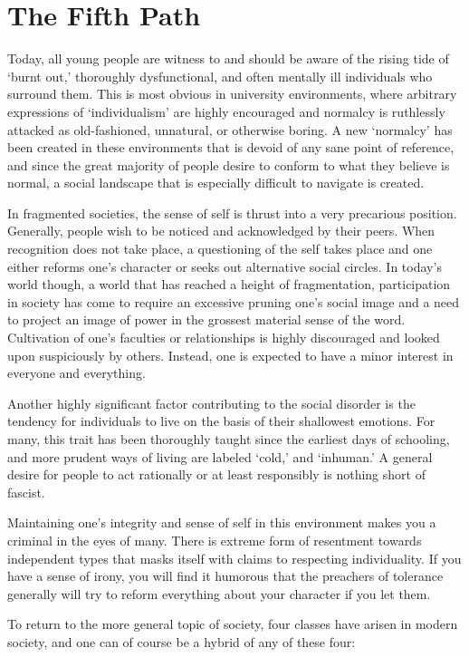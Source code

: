 \section{The Fifth Path}

Today, all young people are witness to and should be aware of the rising tide of `burnt out,' thoroughly dysfunctional, and often mentally ill individuals who surround them. This is most obvious in university environments, where arbitrary expressions of `individualism' are highly encouraged and normalcy is ruthlessly attacked as old-fashioned, unnatural, or otherwise boring. A new `normalcy' has been created in these environments that is devoid of any sane point of reference, and since the great majority of people desire to conform to what they believe is normal, a social landscape that is especially difficult to navigate is created.

In fragmented societies, the sense of self is thrust into a very precarious position. Generally, people wish to be noticed and acknowledged by their peers. When recognition does not take place, a questioning of the self takes place and one either reforms one's character or seeks out alternative social circles. In today's world though, a world that has reached a height of fragmentation, participation in society has come to require an excessive pruning one's social image and a need to project an image of power in the grossest material sense of the word. Cultivation of one's faculties or relationships is highly discouraged and looked upon suspiciously by others. Instead, one is expected to have a minor interest in everyone and everything.

Another highly significant factor contributing to the social disorder is the tendency for individuals to live on the basis of their shallowest emotions. For many, this trait has been thoroughly taught since the earliest days of schooling, and more prudent ways of living are labeled `cold,' and `inhuman.' A general desire for people to act rationally or at least responsibly is nothing short of fascist.

Maintaining one's integrity and sense of self in this environment makes you a criminal in the eyes of many. There is extreme form of resentment towards independent types that masks itself with claims to respecting individuality. If you have a sense of irony, you will find it humorous that the preachers of tolerance generally will try to reform everything about your character if you let them.

To return to the more general topic of society, four classes have arisen in modern society, and one can of course be a hybrid of any of these four:

